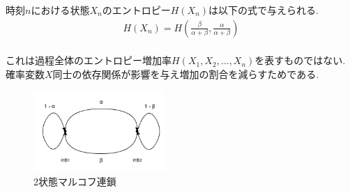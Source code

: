 \documentclass[a4j]{jsarticle}
\begin{document}





 時刻$n$における状態$X_n$のエントロピー$H(X_n)$は以下の式で与えられる.
\begin{align}
	H(X_n) = H\left(\frac{\beta}{\alpha + \beta}, \frac{\alpha}{\alpha + \beta}\right)
\end{align}\\

これは過程全体のエントロピー増加率$H(X_1, X_2, \ldots, X_n)$を表すものではない. 確率変数$X$同士の依存関係が影響を与え増加の割合を減らすためである.

\begin{figure}[H]
	\centering
	\includegraphics[width = 5.0cm]{example1.8.png}
	\caption{2状態マルコフ連鎖}
	\label{example-1.8}
\end{figure}
\end{document}
